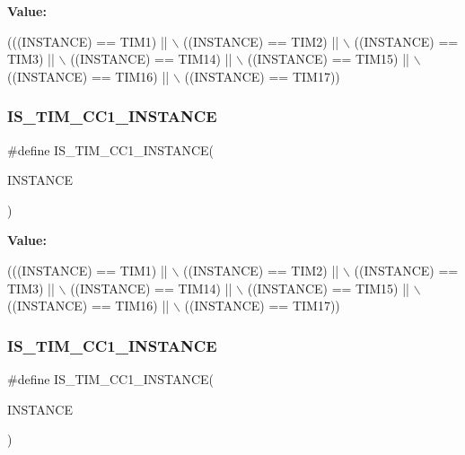 {\bfseries Value\+:}
\begin{DoxyCode}
(((INSTANCE) == TIM1)    || \(\backslash\)
   ((INSTANCE) == TIM2)    || \(\backslash\)
   ((INSTANCE) == TIM3)    || \(\backslash\)
   ((INSTANCE) == TIM14)   || \(\backslash\)
   ((INSTANCE) == TIM15)   || \(\backslash\)
   ((INSTANCE) == TIM16)   || \(\backslash\)
   ((INSTANCE) == TIM17))
\end{DoxyCode}
\mbox{\label{group___exported__macro_ga0c02efc77b1bfb640d7f6593f58ad464}} 
\subsubsection{\texorpdfstring{I\+S\+\_\+\+T\+I\+M\+\_\+\+C\+C1\+\_\+\+I\+N\+S\+T\+A\+N\+CE}{IS\_TIM\_CC1\_INSTANCE}\hspace{0.1cm}{\footnotesize\ttfamily [10/16]}}
{\footnotesize\ttfamily \#define I\+S\+\_\+\+T\+I\+M\+\_\+\+C\+C1\+\_\+\+I\+N\+S\+T\+A\+N\+CE(\begin{DoxyParamCaption}\item[{}]{I\+N\+S\+T\+A\+N\+CE }\end{DoxyParamCaption})}

{\bfseries Value\+:}
\begin{DoxyCode}
(((INSTANCE) == TIM1)    || \(\backslash\)
   ((INSTANCE) == TIM2)    || \(\backslash\)
   ((INSTANCE) == TIM3)    || \(\backslash\)
   ((INSTANCE) == TIM14)   || \(\backslash\)
   ((INSTANCE) == TIM15)   || \(\backslash\)
   ((INSTANCE) == TIM16)   || \(\backslash\)
   ((INSTANCE) == TIM17))
\end{DoxyCode}
\mbox{\label{group___exported__macro_ga0c02efc77b1bfb640d7f6593f58ad464}} 
\subsubsection{\texorpdfstring{I\+S\+\_\+\+T\+I\+M\+\_\+\+C\+C1\+\_\+\+I\+N\+S\+T\+A\+N\+CE}{IS\_TIM\_CC1\_INSTANCE}\hspace{0.1cm}{\footnotesize\ttfamily [11/16]}}
{\footnotesize\ttfamily \#define I\+S\+\_\+\+T\+I\+M\+\_\+\+C\+C1\+\_\+\+I\+N\+S\+T\+A\+N\+CE(\begin{DoxyParamCaption}\item[{}]{I\+N\+S\+T\+A\+N\+CE }\end{DoxyParamCaption})}

